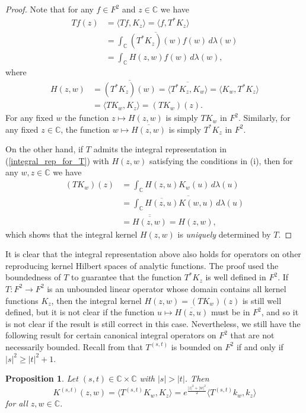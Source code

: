 \documentclass[reqno]{amsart}
\newtheorem{proposition}[theorem]{Proposition}
\newcommand{\C}{{\mathbb C}}
\newcommand{\inc}{\int_{\C}}
\begin{document}
\begin{proof}
Note that for any $f\in F^2$ and $z\in\C$ we have
\begin{align*}
Tf(z)&=\langle Tf, K_z\rangle=\langle f, T^*K_z\rangle\\
&=\inc\overline{(T^*K_z)(w)}f(w)\,d\lambda(w)\\
&=\inc H(z,w)f(w)\,d\lambda(w),
\end{align*}
where
\begin{align*}
H(z,w)&=\overline{(T^*K_z)(w)}=\overline{\langle T^*K_z,
K_w\rangle}=\langle K_w, T^*K_z\rangle\\
&=\langle TK_w, K_z\rangle=(TK_w)(z).
\end{align*}
For any fixed $w$ the function $z\mapsto H(z,w)$ is simply
$TK_w$ in $F^2$. Similarly, for any fixed $z\in\C$, the function
$w\mapsto\overline{H(z,w)}$ is simply $T^*K_z$ in $F^2$.

On the other hand, if $T$ admits the integral representation
in (\ref{integral_rep_for_T}) with $H(z,w)$ satisfying the
conditions in (i), then for any $w,z\in\C$ we have
\begin{align*}
(TK_w)(z)&=\inc H(z,u)K_w(u)\,d\lambda(u)\\
&=\overline{\inc\overline{H(z,u)}K(w,u)\,d\lambda(u)}\\
&=\overline{\overline{H(z,w)}}=H(z,w),
\end{align*}
which shows that the integral kernel $H(z,w)$ is {\it uniquely}
determined by $T$.
\end{proof}

It is clear that the integral representation above also holds for
operators on other reproducing kernel Hilbert spaces of analytic
functions. The proof used the boundedness of $T$ to guarantee
that the function $T^*K_z$ is well defined in $F^2$. If
$T: F^2\to F^2$ is an unbounded linear operator whose domain
contains all kernel functions $K_z$, then the integral kernel
$H(z,w)=(TK_w)(z)$ is still well defined, but it is not clear if the
function $u\mapsto\overline{H(z,u)}$ must be in $F^2$, and so it
is not clear if the result is still correct in this case. Nevertheless,
we still have the following result for certain canonical
integral operators on $F^2$ that are not necessarily bounded. Recall
from \cite{DZ3} that $T^{(s,t)}$ is bounded on $F^2$ if and only
if $|s|^2\geq |t|^2+1$.

\begin{proposition}\label{propBT}
Let $(s, t)\in\mathbb{C}\times\mathbb{C}$ with $|s|>|t|$. Then
$$K^{(s,t)}(z, w)=\langle T^{(s,t)}K_w, K_z\rangle
=e^{\frac{|z|^2+|w|^2}{2}}\langle T^{(s,t)}k_w, k_z\rangle$$
for all $z,w\in\C$.
\end{proposition}
\end{document}
